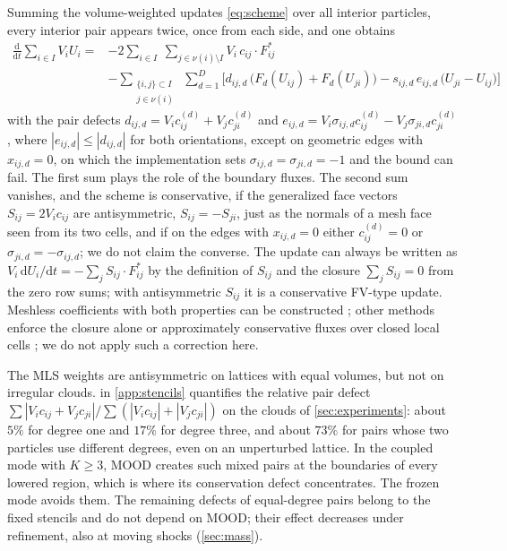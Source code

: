 \documentclass[11pt,a4paper]{article}
\numberwithin{equation}{section}
\newcommand{\dd}{\mathrm{d}}
\newcommand{\nb}{\nu}
\newcommand{\Fs}{F^{*}}
\begin{document}
Summing the volume-weighted updates \eqref{eq:scheme} over all interior particles, every interior pair appears twice, once from each side, and one obtains
\begin{equation}\label{eq:balance}
\begin{aligned}
\frac{\dd}{\dd t}\sum_{i\in I}V_iU_i
={}& -2\sum_{i\in I}\ \sum_{j\in\nb(i)\setminus I} V_i\,c_{ij}\cdot\Fs_{ij}\\
&-\sum_{\substack{\{i,j\}\subset I\\ j\in\nb(i)}}\ \sum_{d=1}^D\Big[d_{ij,d}\,\big(F_d(U_{ij})+F_d(U_{ji})\big)-s_{ij,d}\,e_{ij,d}\,\big(U_{ji}-U_{ij}\big)\Big]
\end{aligned}
\end{equation}
with the pair defects $d_{ij,d}=V_ic^{(d)}_{ij}+V_jc^{(d)}_{ji}$ and $e_{ij,d}=V_i\sigma_{ij,d}c^{(d)}_{ij}-V_j\sigma_{ji,d}c^{(d)}_{ji}$, where $|e_{ij,d}|\le|d_{ij,d}|$ for both orientations, except on geometric edges with $x_{ij,d}=0$, on which the implementation sets $\sigma_{ij,d}=\sigma_{ji,d}=-1$ and the bound can fail. The first sum plays the role of the boundary fluxes. The second sum vanishes, and the scheme is conservative, if the generalized face vectors $S_{ij}=2V_ic_{ij}$ are antisymmetric, $S_{ij}=-S_{ji}$, just as the normals of a mesh face seen from its two cells, and if on the edges with $x_{ij,d}=0$ either $c^{(d)}_{ij}=0$ or $\sigma_{ji,d}=-\sigma_{ij,d}$; we do not claim the converse. The update can always be written as $V_i\,\dd U_i/\dd t=-\sum_jS_{ij}\cdot\Fs_{ij}$ by the definition of $S_{ij}$ and the closure $\sum_jS_{ij}=0$ from the zero row sums; with antisymmetric $S_{ij}$ it is a conservative FV-type update. Meshless coefficients with both properties can be constructed \cite{Chiu2011,Chiu2012}; other methods enforce the closure alone \cite{Huh2018} or approximately conservative fluxes over closed local cells \cite{Suchde2017,SuchdeThesis2018}; we do not apply such a correction here.

The MLS weights are antisymmetric on lattices with equal volumes, but not on irregular clouds.  in \cref{app:stencils} quantifies the relative pair defect $\sum|V_ic_{ij}+V_jc_{ji}|/\sum(|V_ic_{ij}|+|V_jc_{ji}|)$ on the clouds of \cref{sec:experiments}: about $5\%$ for degree one and $17\%$ for degree three, and about $73\%$ for pairs whose two particles use different degrees, even on an unperturbed lattice. In the coupled mode with $K\ge3$, MOOD creates such mixed pairs at the boundaries of every lowered region, which is where its conservation defect concentrates. The frozen mode avoids them. The remaining defects of equal-degree pairs belong to the fixed stencils and do not depend on MOOD; their effect decreases under refinement, also at moving shocks (\cref{sec:mass}).
\end{document}
